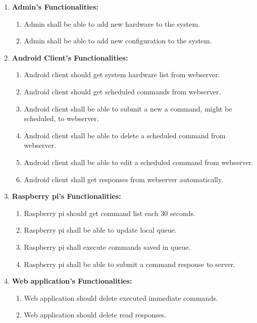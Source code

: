 \documentclass[12pt, oneside, a4paper]{book}
\newcommand\boldcolor[1]{\textcolor{bold}{\textbf{#1}}}
\begin{document}
				\begin{enumerate}[label=3.2.3.\arabic*]
					\item \boldcolor{Admin's Functionalities:}
					\begin{enumerate}
						\item Admin shall be able to add new hardware to the system. %
						\item Admin shall be able to add new configuration to the system. %
					\end{enumerate}
					\item \boldcolor{Android Client's Functionalities:}
					\begin{enumerate}
						\item Android client should get system hardware list from webserver. %
						\item Android client should get scheduled commands from webserver. %
						\item Android client shall be able to submit a new a command, might be scheduled, to webserver. %
						\item Android client shall be able to delete a scheduled command from webserver. %
						\item Android client shall be able to edit a scheduled command from webserver. %
						\item Android client shall get responses from webserver automatically. %
					\end{enumerate}
					\item \boldcolor{Raspberry pi's Functionalities:}
					\begin{enumerate}
						\item Raspberry pi should get command list each 30 seconds. %
						\item Raspberry pi shall be able to update local queue. %
						\item Raspberry pi shall execute commands saved in queue. %
						\item Raspberry pi shall be able to submit a command response to server. %
					\end{enumerate}
					\item \boldcolor{Web application's Functionalities:}
					\begin{enumerate}
						\item Web application should delete executed immediate commands. %
						\item Web application should delete read responses. %
					\end{enumerate}
				\end{enumerate}
\end{document}
